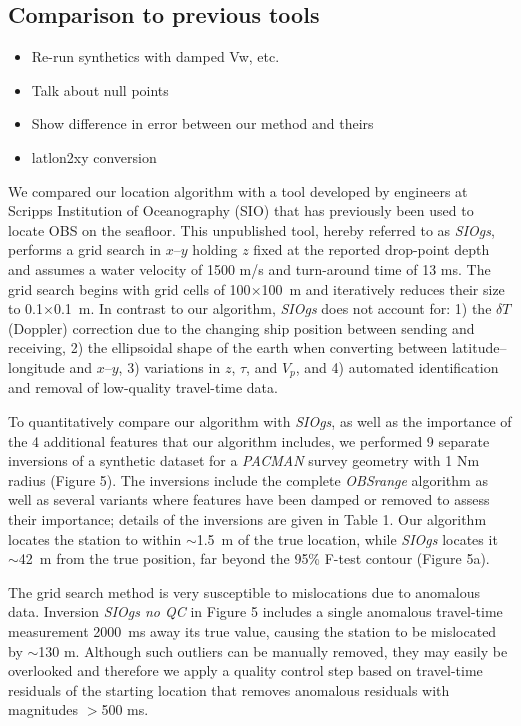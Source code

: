 \subsection{Comparison to previous tools}

\begin{itemize}
\item Re-run synthetics with damped Vw, etc.\\
\item Talk about null points\\
\item Show difference in error between our method and theirs\\
\item latlon2xy conversion\\
\end{itemize}

We compared our location algorithm with a tool developed by engineers at Scripps Institution of Oceanography (SIO) that has previously been used to locate OBS on the seafloor. This unpublished tool, hereby referred to as \textit{SIOgs}, performs a grid search in $x$--$y$ holding $z$ fixed at the reported drop-point depth and assumes a water velocity of 1500 m/s and turn-around time of 13 ms. The grid search begins with grid cells of 100$\times$100~m and iteratively reduces their size to 0.1$\times$0.1~m. In contrast to our algorithm, \textit{SIOgs} does not account for: 1) the $\delta T$ (Doppler) correction due to the changing ship position between sending and receiving, 2) the ellipsoidal shape of the earth when converting between latitude--longitude and $x$--$y$, 3) variations in $z$, $\tau$, and $V_p$, and 4) automated identification and removal of low-quality travel-time data. 

To quantitatively compare our algorithm with \textit{SIOgs}, as well as the importance of the 4 additional features that our algorithm includes, we performed 9 separate inversions of a synthetic dataset for a \textit{PACMAN} survey geometry with 1 Nm radius (Figure 5). The inversions include the complete \textit{OBSrange} algorithm as well as several variants where features have been damped or removed to assess their importance; details of the inversions are given in Table 1. Our algorithm locates the station to within $\sim$1.5~m of the true location, while \textit{SIOgs} locates it $\sim$42~m from the true position, far beyond the 95\% F-test contour (Figure 5a). 

The grid search method is very susceptible to mislocations due to anomalous data. Inversion \textit{SIOgs no QC} in Figure 5 includes a single anomalous travel-time measurement 2000~ms away its true value, causing the station to be mislocated by $\sim$130 m. Although such outliers can be manually removed, they may easily be overlooked and therefore we apply a quality control step based on travel-time residuals of the starting location that removes anomalous residuals with magnitudes $>$500 ms.

